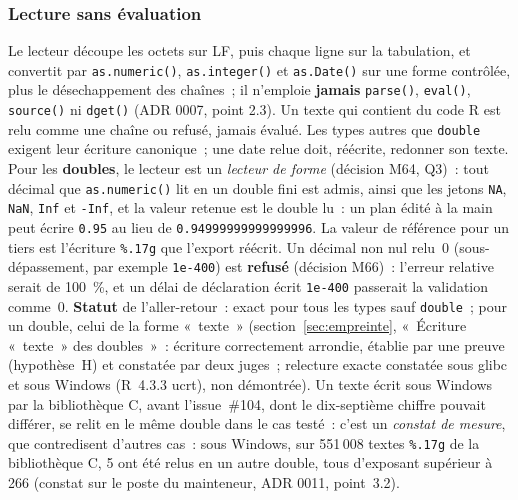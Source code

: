 \documentclass[a4paper,11pt]{article}
\newcommand{\code}[1]{\texttt{\small #1}}
\begin{document}
\subsubsection*{Lecture sans évaluation}

Le lecteur découpe les octets sur LF, puis chaque ligne sur la tabulation, et
convertit par \code{as.numeric()}, \code{as.integer()} et \code{as.Date()}
sur une forme contrôlée, plus le désechappement des chaînes~; il n'emploie
\textbf{jamais} \code{parse()}, \code{eval()}, \code{source()} ni
\code{dget()} (ADR 0007, point 2.3). Un texte qui contient du code R est
relu comme une chaîne ou refusé, jamais évalué. Les types autres que
\code{double} exigent leur écriture canonique~; une date relue doit, réécrite,
redonner son texte. Pour les \textbf{doubles}, le lecteur est un
\emph{lecteur de forme} (décision M64, Q3)~: tout décimal que
\code{as.numeric()} lit en un double fini est admis, ainsi que les jetons
\code{NA}, \code{NaN}, \code{Inf} et \code{-Inf}, et la valeur retenue est
le double lu~: un plan édité à la main peut écrire \code{0.95} au lieu de
\code{0.94999999999999996}. La valeur de référence pour un tiers est
l'écriture \code{\%.17g} que l'export réécrit. Un décimal non nul relu~0
(sous-dépassement, par exemple \code{1e-400}) est \textbf{refusé} (décision
M66)~: l'erreur relative serait de 100~\%, et un délai de déclaration écrit
\code{1e-400} passerait la validation comme~0. \textbf{Statut} de
l'aller-retour~: exact pour tous les types sauf \code{double}~; pour un
double, celui de la forme «~texte~» (section~\ref{sec:empreinte}, «~Écriture
«~texte~» des doubles~»~: écriture correctement arrondie, établie par une
preuve (hypothèse~H) et constatée par deux juges~; relecture exacte
constatée sous glibc et sous Windows (R~4.3.3 ucrt), non démontrée). Un texte écrit sous Windows par la
bibliothèque C, avant l'issue~\#104, dont le dix-septième chiffre pouvait
différer, se relit en le même double dans le cas testé~: c'est un
\emph{constat de mesure}, que contredisent d'autres cas~: sous Windows, sur
551\,008 textes \code{\%.17g} de la bibliothèque C, 5 ont été relus en un autre double, tous
d'exposant supérieur à 266 (constat sur le poste du mainteneur, ADR 0011,
point~3.2).
\end{document}
